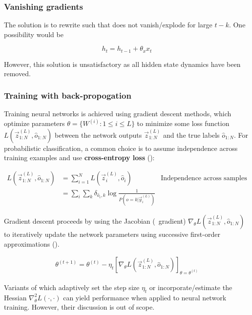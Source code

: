 \subsubsection{Vanishing gradients}

The solution is to rewrite  such that
 does not vanish/explode for large $t - k$.
One possibility would be

\begin{equation}
    h_t = h_{t-1} + \theta_x x_t
\end{equation}

However, this solution is unsatisfactory as all hidden state dynamics have been
removed.


\subsubsection{Training with back-propogation}

Training neural networks is achieved using gradient descent methods, which
optimize parameters $\theta = \{W^{(i)} : 1 \leq i \leq L \}$ to minimize some
loss function $L(\vec{z}^{(L)}_{1:N}, \hat{o}_{1:N})$ between the network
outputs $\vec{z}^{(L)}_{1:N}$ and the true labels $\hat{o}_{1:N}$. For
probabilistic classification, a common choice is to assume independence
across training examples and use \textbf{cross-entropy loss}
():

\begin{align}
    L(\vec{z}^{(L)}_{1:N}, \hat{o}_{1:N})
    &= \sum_{i=1}^{N} L(\vec{z}^{(L)}_i, \hat{o}_i) &\text{Independence across samples} \nonumber\\
    &= \sum_i \sum_k \delta_{\hat{o}_i,k} \log \frac{1}{P(o=k | \vec{y}_i^{(L)})} & \label{eq:cross-entropy-loss}
\end{align}

Gradient descent proceeds by using the Jacobian (\ie\ gradient) $\nabla_\theta
L(\vec{z}^{(L)}_{1:N}, \hat{o}_{1:N})$ to iteratively update the network
parameters using successive first-order approximations ().

\begin{align}
    \label{eq:nn-training-iteration-scheme}
    \theta^{(t+1)} = \theta^{(t)}
    - \eta_t \left[ \nabla_\theta L(\vec{z}^{(L)}_{1:N}, \hat{o}_{1:N}) \right]_{\theta = \theta^{(t)}}
\end{align}

Variants of  which adaptively set the
step size $\eta_t$ or incorporate/estimate the Hessian $\nabla^2_{\theta}
L(\cdot, \cdot)$ can yield performance when applied to neural network training.
However, their discussion is out of scope. 

